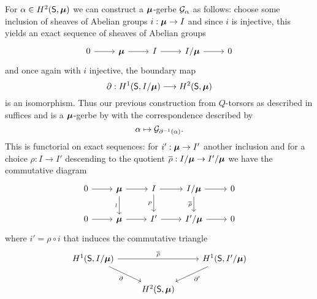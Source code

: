For $\alpha\in H^{2}(\mathsf{S},\bm{\mu})$ we can construct a $\bm{\mu}$-gerbe $\mathcal{G}_{\alpha}$ as follows: choose some inclusion of sheaves of Abelian groups $i:\bm{\mu}\to I$ and since $i$ is injective, this yields an exact sequence of sheaves of Abelian groups 
$$%
\begin{tikzcd}
	0 & \Bmu & I & {I/\Bmu} & 0
	\arrow[from=1-1, to=1-2]
	\arrow[from=1-2, to=1-3]
	\arrow[from=1-3, to=1-4]
	\arrow[from=1-4, to=1-5]
\end{tikzcd}$$
and once again with $i$ injective, the boundary map 
$$\partial: H^{1}(\mathsf{S},I/\bm{\mu})\longrightarrow H^{2}(\mathsf{S},\bm{\mu})$$
is an isomorphism. Thus our previous construction from $Q$-torsors as described in  suffices and is a $\bm{\mu}$-gerbe by  with the correspondence described by 
$$\alpha\mapsto\mathcal{G}_{\partial^{-1}(\alpha)}.$$
This is functorial on exact sequences: for $i':\bm{\mu}\to I'$ another inclusion and for a choice $\rho:I\to I'$ descending to the quotient $\overline{\rho}:I/\bm{\mu}\to I'/\bm{\mu}$ we have the commutative diagram
$$%
\begin{tikzcd}
	0 & \Bmu & I & {I/\Bmu} & 0 \\
	0 & \Bmu & {I'} & {I'/\Bmu} & 0
	\arrow[from=1-1, to=1-2]
	\arrow[from=1-2, to=1-3]
	\arrow[from=1-3, to=1-4]
	\arrow[from=1-4, to=1-5]
	\arrow[from=2-1, to=2-2]
	\arrow[from=2-2, to=2-3]
	\arrow[from=2-3, to=2-4]
	\arrow[from=2-4, to=2-5]
	\arrow["\wr"', from=1-2, to=2-2]
	\arrow["\rho"', from=1-3, to=2-3]
	\arrow["{\overline{\rho}}"', from=1-4, to=2-4]
\end{tikzcd}$$
where $i'=\rho\circ i$ that induces the commutative triangle 
$$%
\begin{tikzcd}
	{H^{1}(\Ssf,I/\Bmu)} && {H^{1}(\Ssf,I'/\Bmu)} \\
	& {H^{2}(\Ssf,\Bmu)}
	\arrow["\partial"', from=1-1, to=2-2]
	\arrow["{\overline{\rho}}", from=1-1, to=1-3]
	\arrow["{\partial'}", from=1-3, to=2-2]
\end{tikzcd}$$
